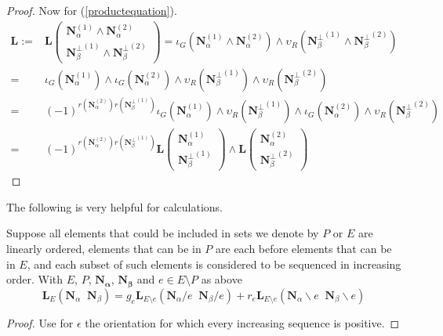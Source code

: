 \documentclass[Unicode]{cedram-alco}
\newcommand{\ext}[1]{\ensuremath{\mathbf{#1}}}
\newcommand{\eNal}{\ensuremath{\ext{N}_{\alpha}}}
\newcommand{\eNbe}{\ensuremath{\ext{N}_\beta}}
\newcommand{\Is}{\ensuremath{\iota}}
\newcommand{\Vs}{\ensuremath{\upsilon}}
\newcommand{\extLHorSub}[3]{\ext{L}_{#1}\left(  {#2}\;\; {#3}  \right)}
\begin{document}
\begin{proof}
Now for (\ref{productequation}).
\begin{equation}
  \begin{split}
  \ext{L} := & \ext{L}\left( \begin{array}{c}
    \ext{N}_\alpha^{(1)}\wedge \ext{N}_\alpha^{(2)}\\
    {\ext{N}_\beta^\perp}^{(1)}\wedge{\ext{N}_\beta^\perp}^{(2)}\end{array} \right)
  =\Is_G(\ext{N}_\alpha^{(1)}\wedge \ext{N}_\alpha^{(2)})
  \wedge\Vs_R({\ext{N}_\beta^\perp}^{(1)}\wedge{\ext{N}_\beta^\perp}^{(2)})
  \\
  =&
  \Is_G(\ext{N}_\alpha^{(1)})\wedge \Is_G(\ext{N}_\alpha^{(2)})
  \wedge\Vs_R({\ext{N}_\beta^\perp}^{(1)})\wedge\Vs_R({\ext{N}_\beta^\perp}^{(2)})
  \\
  =& 
  (-1)^{r(\ext{N}_\alpha^{(2)})r({\ext{N}_\beta^\perp}^{(1)})}
    \Is_G(\ext{N}_\alpha^{(1)}) \wedge \Vs_R({\ext{N}_\beta^\perp}^{(1)}) \wedge
    \Is_G(\ext{N}_\alpha^{(2)}) \wedge \Vs_R({\ext{N}_\beta^\perp}^{(2)})
    \\
   =&
   (-1)^{r(\ext{N}_\alpha^{(2)})r({\ext{N}_\beta^\perp}^{(1)})}
   \ext{L}\left( \begin{array}{c}
    \ext{N}_\alpha^{(1)}\\
        {\ext{N}_\beta^\perp}^{(1)}\end{array} \right)
   \wedge
     \ext{L}\left( \begin{array}{c}
    \ext{N}_\alpha^{(2)}\\
        {\ext{N}_\beta^\perp}^{(2)}\end{array} \right)
  \end{split}
\end{equation}




\end{proof}

The following is very helpful for calculations.

\begin{coro}
  Suppose all elements that could be included in sets we denote by $P$ or $E$ are linearly ordered,
  elements that can be in $P$ are each before elements that can be in $E$,
  and each subset of such elements is considered to be sequenced in increasing order.  With
  $E$, $P$, $\ext{N_\alpha}$, $\ext{N_\beta}$ and $e\in E\setminus P$ as above
  \begin{equation}
       \extLHorSub{E}{\eNal}{\eNbe}=
      g_e\extLHorSub{E\setminus e}{\eNal/e}{\eNbe/e} +
      r_e\extLHorSub{E\setminus e}{\eNal\backslash e}{\eNbe\backslash e}
  \end{equation}
\end{coro}
\begin{proof}
  Use for $\epsilon$ the orientation for which every increasing sequence is positive.
\end{proof}
\end{document}
